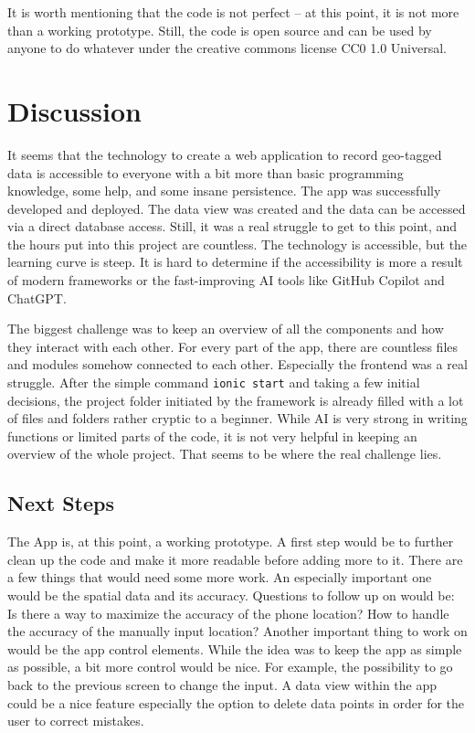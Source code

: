 \documentclass{josis}
\begin{document}
It is worth mentioning that the code is not perfect -- at this point, it is not more than a working prototype. Still, the code is open source and can
be used by anyone to do whatever under the creative commons license CC0 1.0 Universal.

\section{Discussion}

It seems that the technology to create a web application to record geo-tagged data is accessible to everyone with a bit more than basic programming knowledge,
some help, and some insane persistence. The app was successfully developed and deployed. The data view was created and the data can be accessed via a direct database access.
Still, it was a real struggle to get to this point, and the hours put into this project are countless. The technology is accessible, but the learning curve is steep.
It is hard to determine if the accessibility is more a result of modern frameworks or the fast-improving AI tools like GitHub Copilot and ChatGPT.

The biggest challenge was to keep an overview of all the components and how they interact with each other. For every part of the app, there are countless
files and modules somehow connected to each other. Especially the frontend was a real struggle. After the simple command \texttt{ionic start} and
taking a few initial decisions, the project folder initiated by the framework is already filled with a lot of files and folders rather cryptic to a beginner. While AI is
very strong in writing functions or limited parts of the code, it is not very helpful in keeping an overview of the whole project.
That seems to be where the real challenge lies.

\subsection{Next Steps}

The App is, at this point, a working prototype. A first step would be to further clean up the code and make it more readable before adding more to it.
There are a few things that would need some more work. An especially important one would be the spatial data and its accuracy.
Questions to follow up on would be: Is there a way to maximize the accuracy of the phone location? 
How to handle the accuracy of the manually input location?
Another important thing to work on would be the app control elements. While the idea was to keep the app as simple as possible,
a bit more control would be nice. For example, the possibility to go back to the previous screen to change the input.
A data view within the app could be a nice feature especially the option to delete data points
in order for the user to correct mistakes.
\end{document}
